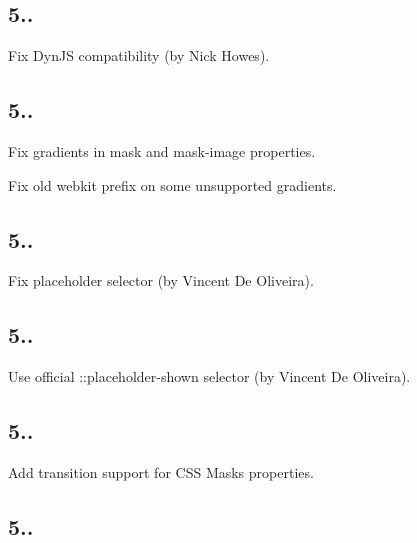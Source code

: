 \subsection*{5..}


\begin{DoxyItemize}
\item Fix Dyn\+JS compatibility (by Nick Howes).
\end{DoxyItemize}

\subsection*{5..}


\begin{DoxyItemize}
\item Fix gradients in {\ttfamily mask} and {\ttfamily mask-\/image} properties.
\item Fix old webkit prefix on some unsupported gradients.
\end{DoxyItemize}

\subsection*{5..}


\begin{DoxyItemize}
\item Fix placeholder selector (by Vincent De Oliveira).
\end{DoxyItemize}

\subsection*{5..}


\begin{DoxyItemize}
\item Use official {\ttfamily \+::placeholder-\/shown} selector (by Vincent De Oliveira).
\end{DoxyItemize}

\subsection*{5..}


\begin{DoxyItemize}
\item Add transition support for C\+SS Masks properties.
\end{DoxyItemize}

\subsection*{5..}


